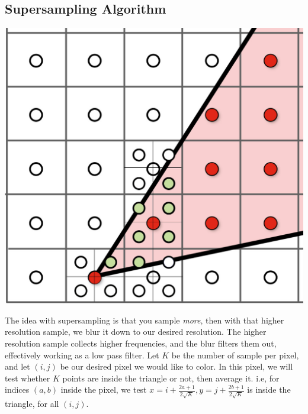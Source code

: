 \documentclass{article}
\begin{document}
\subsection{Supersampling Algorithm}
\begin{center}
    \includegraphics[]{Task 2/supersampling.png}
\end{center}
The idea with supersampling is that you sample \textit{more}, then with that higher resolution sample, we blur it down to our desired resolution. The higher resolution sample collects higher frequencies, and the blur filters them out, effectively working as a low pass filter. Let $K$ be the number of sample per pixel, and let $(i, j)$ be our desired pixel we would like to color. In this pixel, we will test whether $K$ points are inside the triangle or not, then average it. i.e, for indices $(a, b)$ inside the pixel, we test $x = i + \frac{2a + 1}{2\sqrt{K}}, y = j + \frac{2b + 1}{2\sqrt{K}}$ is inside the triangle, for all $(i, j)$.
\end{document}
